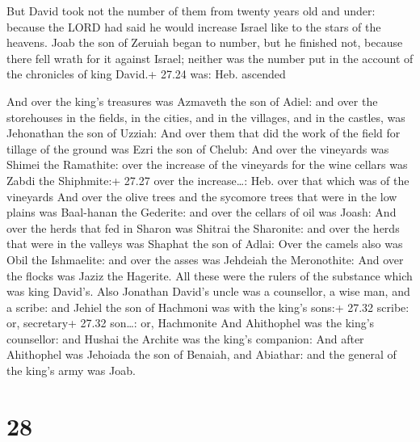  But David took not the number of them from twenty years
old and under: because the LORD had said he would increase Israel like
to the stars of the heavens.  Joab the son of Zeruiah began
to number, but he finished not, because there fell wrath for it against
Israel; neither was the number put in the account of the chronicles of
king David.+ 27.24 was: Heb. ascended

 And over the king's treasures was Azmaveth the son of
Adiel: and over the storehouses in the fields, in the cities, and in the
villages, and in the castles, was Jehonathan the son of Uzziah:
 And over them that did the work of the field for tillage
of the ground was Ezri the son of Chelub:  And over the
vineyards was Shimei the Ramathite: over the increase of the vineyards
for the wine cellars was Zabdi the Shiphmite:+ 27.27 over the
increase\ldots: Heb. over that which was of the vineyards 
And over the olive trees and the sycomore trees that were in the low
plains was Baal-hanan the Gederite: and over the cellars of oil was
Joash:  And over the herds that fed in Sharon was Shitrai
the Sharonite: and over the herds that were in the valleys was Shaphat
the son of Adlai:  Over the camels also was Obil the
Ishmaelite: and over the asses was Jehdeiah the Meronothite:
 And over the flocks was Jaziz the Hagerite. All these were
the rulers of the substance which was king David's.  Also
Jonathan David's uncle was a counsellor, a wise man, and a scribe: and
Jehiel the son of Hachmoni was with the king's sons:+ 27.32 scribe: or,
secretary+ 27.32 son\ldots: or, Hachmonite  And Ahithophel
was the king's counsellor: and Hushai the Archite was the king's
companion:  And after Ahithophel was Jehoiada the son of
Benaiah, and Abiathar: and the general of the king's army was Joab.

\hypertarget{section-27}{%
\section{28}\label{section-27}}

